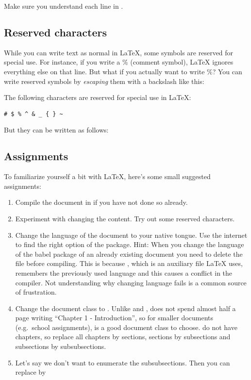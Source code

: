 Make sure you understand each line in . 

\subsection{Reserved characters}
While you can write text as normal in \LaTeX{}, some symbols are reserved for special use. For instance, if you write a \% (comment symbol), \LaTeX{} ignores everything else on that line. But what if you actually want to write \%? You can write reserved symbols by \emph{escaping} them with a backslash like this:

The following characters are reserved for special use in \LaTeX{}:
\begin{verbatim}
# $ % ^ & _ { } ~
\end{verbatim} 

But they can be written as follows:

\latexone{\# \$ \% \^{} \& \_ \{ \} \~{} \textbackslash{}}


\subsection{Assignments}
To familiarize yourself a bit with \LaTeX{}, here's some small suggested assignments:
\begin{enumerate}
	\item Compile the document in  if you have not done so already.
	\item Experiment with changing the content. Try out some reserved characters.
	\item Change the language of the document to your native tongue. Use the internet to find the right option of the  package. Hint: When you change the language of the babel package of an already existing document you need to delete the file  before compiling. This is because , which is an auxiliary file \LaTeX{} uses, remembers the previously used language and this causes a conflict in the compiler. Not understanding why changing language fails is a common source of frustration.
	\item Change the document class to . Unlike  and ,  does not spend almost half a page writing ``Chapter 1 - Introduction'', so for smaller documents (e.g.\ school assignments),  is a good document class to choose.  do not have chapters, so replace all chapters by sections, sections by subsections and subsections by subsubsections.
	\item Let's say we don't want to enumerate the subsubsections. Then you can replace  by 
\end{enumerate}

